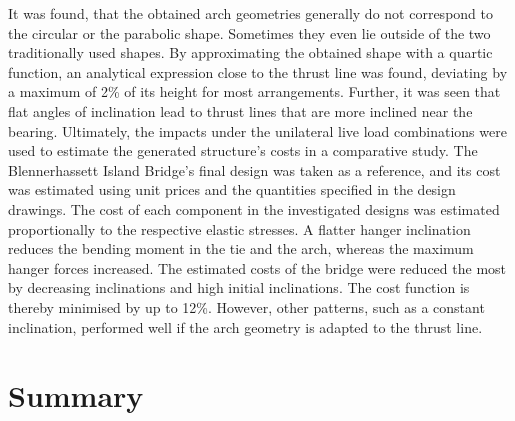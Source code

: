 It was found, that the obtained arch geometries generally do not correspond to the circular or the parabolic shape. Sometimes they even lie outside of the two traditionally used shapes. By approximating the obtained shape with a quartic function, an analytical expression close to the thrust line was found, deviating by a maximum of 2\% of its height for most arrangements. Further, it was seen that flat angles of inclination lead to thrust lines that are more inclined near the bearing. Ultimately, the impacts under the unilateral live load combinations were used to estimate the generated structure's costs in a comparative study. The Blennerhassett Island Bridge's final design was taken as a reference, and its cost was estimated using unit prices and the quantities specified in the design drawings. The cost of each component in the investigated designs was estimated proportionally to the respective elastic stresses. A flatter hanger inclination reduces the bending moment in the tie and the arch, whereas the maximum hanger forces increased. The estimated costs of the bridge were reduced the most by decreasing inclinations and high initial inclinations. The cost function is thereby minimised by up to 12\%. However, other patterns, such as a constant inclination, performed well if the arch geometry is adapted to the thrust line.


\section{Summary} \label{sec:rev_sum}

